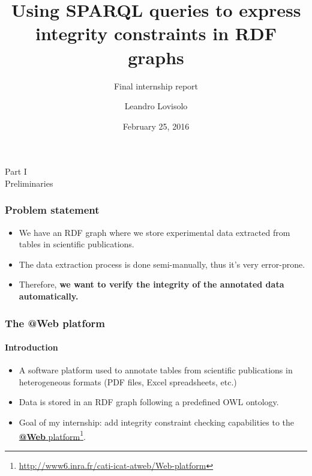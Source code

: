 \documentclass{beamer}
\title{Using SPARQL queries to express integrity constraints in RDF graphs}
\subtitle{
  \vspace{0.5cm}
  Final internship report
}
\author{
  Leandro Lovisolo
}
\date{February 25, 2016}
\institute{
  INRA SupAgro and INRIA GraphiK \\
  Montpellier, France
}
\makeatletter
\newcommand{\atweb}{\textbf{@Web}\xspace}
\newcommand{\partslide}[2]{
  \begin{center}
    \LARGE{#1} \\
    \vspace{0.5cm}
    \huge{#2}
  \end{center}
}
\newcommand{\fnhref}[2]{\href{#2}{#1}\footnote{\url{#2}}}
\makeatother
\begin{document}
\begin{frame}
  \titlepage
\end{frame}


\begin{frame}
  \partslide{Part I}{Preliminaries}
\end{frame}

\begin{frame}
  \frametitle{Problem statement}

  \begin{itemize}
    \item We have an RDF graph where we store experimental data extracted from
      tables in scientific publications.

    \item The data extraction process is done semi-manually, thus it's very
      error-prone.

    \item Therefore, \textbf{we want to verify the integrity of the annotated
      data automatically.}
  \end{itemize}
\end{frame}

\begin{frame}
  \frametitle{The \atweb platform}
  \framesubtitle{Introduction}

  \begin{itemize}
    \item A software platform used to annotate tables from scientific
      publications in heterogeneous formats (PDF files, Excel spreadsheets,
      etc.)

    \item Data is stored in an RDF graph following a predefined OWL ontology.

    \item Goal of my internship: add integrity constraint checking capabilities
      to the \fnhref{\atweb
      platform}{http://www6.inra.fr/cati-icat-atweb/Web-platform}.
  \end{itemize}
\end{frame}
\end{document}
